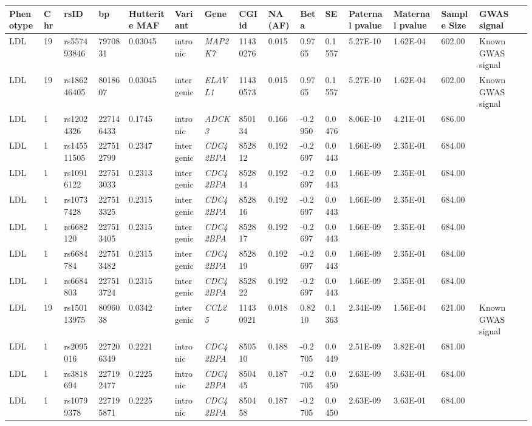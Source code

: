\begin{landscape}
\begin{table}
\centering
\begin{adjustbox}{max width=\linewidth}
\begin{tabular}{@{}p{2cm}|p{0.5cm}p{2cm}p{2cm}p{1.5cm}p{3cm}p{2.5cm}p{1.5cm}p{1cm}p{2cm}p{2cm}p{2cm}p{2cm}p{1.5cm}p{4cm}@{}}
\toprule Phenotype&Chr&rsID&bp&Hutterite MAF&Variant&Gene&CGI id&NA (AF)&Beta&SE&Paternal pvalue &Maternal pvalue &Sample Size& GWAS signal\\ \hline
LDL&19&rs557493846&7970831&0.03045&intronic&\emph{MAP2K7}&11430276&0.015&0.9765&0.1557&5.27E-10&1.62E-04&602.00&Known GWAS signal\\ \hline
LDL&19&rs186246405&8018607&0.03045&intergenic&\emph{ELAVL1}&11430573&0.015&0.9765&0.1557&5.27E-10&1.62E-04&602.00&Known GWAS signal\\ \hline
LDL&1&rs12024326&227146433&0.1745&intronic&\emph{ADCK3}&850134&0.166&-0.2950&0.0476&8.06E-10&4.21E-01&686.00&\\ \hline
LDL&1&rs145511505&227512799&0.2347&intergenic&\emph{CDC42BPA}&852812&0.192&-0.2697&0.0443&1.66E-09&2.35E-01&684.00&\\ \hline
LDL&1&rs10916122&227513033&0.2313&intergenic&\emph{CDC42BPA}&852814&0.192&-0.2697&0.0443&1.66E-09&2.35E-01&684.00&\\ \hline
LDL&1&rs10737428&227513325&0.2315&intergenic&\emph{CDC42BPA}&852816&0.192&-0.2697&0.0443&1.66E-09&2.35E-01&684.00&\\ \hline
LDL&1&rs6682120&227513405&0.2315&intergenic&\emph{CDC42BPA}&852817&0.192&-0.2697&0.0443&1.66E-09&2.35E-01&684.00&\\ \hline
LDL&1&rs6684784&227513482&0.2315&intergenic&\emph{CDC42BPA}&852819&0.192&-0.2697&0.0443&1.66E-09&2.35E-01&684.00&\\ \hline
LDL&1&rs6684803&227513724&0.2315&intergenic&\emph{CDC42BPA}&852822&0.192&-0.2697&0.0443&1.66E-09&2.35E-01&684.00&\\ \hline
LDL&19&rs150113975&8096038&0.0342&intergenic&\emph{CCL25}&11430921&0.018&0.8210&0.1363&2.34E-09&1.56E-04&621.00&Known GWAS signal\\ \hline
LDL&1&rs2095016&227206349&0.2221&intronic&\emph{CDC42BPA}&850510&0.188&-0.2705&0.0449&2.51E-09&3.82E-01&681.00&\\ \hline
LDL&1&rs3818694&227192477&0.2225&intronic&\emph{CDC42BPA}&850445&0.187&-0.2705&0.0450&2.63E-09&3.63E-01&684.00&\\ \hline
LDL&1&rs10799378&227195871&0.2225&intronic&\emph{CDC42BPA}&850458&0.187&-0.2705&0.0450&2.63E-09&3.63E-01&684.00&\\ \hline

\end{tabular}
\end{adjustbox}
\end{table}
\end{landscape}

